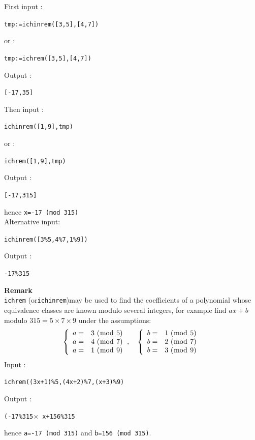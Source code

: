 \documentclass[a4paper,11pt]{book}
\begin{document}
First input :
\begin{center}{\tt tmp:=ichinrem([3,5],[4,7])}\end{center}
or :
\begin{center}{\tt tmp:=ichrem([3,5],[4,7])}\end{center}
Output :
\begin{center}{\tt [-17,35] }\end{center}
Then input :
\begin{center}{\tt ichinrem([1,9],tmp)}\end{center}
or :
\begin{center}{\tt ichrem([1,9],tmp)}\end{center}
Output :
\begin{center}{\tt [-17,315] }\end{center}
hence {\tt x=-17 (mod 315)}\\
Alternative input:\\
\begin{center}{\tt ichinrem([3\%5,4\%7,1\%9])}\end{center}
Output :
\begin{center}{\tt -17\%315 }\end{center}

{\bf Remark}\\
{\tt ichrem} (or{\tt ichinrem})may be used to find the coefficients of a polynomial 
whose equivalence classes are known modulo several integers, for example find
$ax+b$ modulo $315=5 \times 7 \times 9$ under the assumptions:
$${\tt \left \{ \begin{array}{rl} a=&3\ (\bmod\ 5)\\ 
a=&4\ (\bmod\ 7) \\ 
a=&1\ (\bmod\ 9) \end{array}\right.},
\quad 
{\tt \left \{ \begin{array}{rl} b=&1\ (\bmod\ 5)\\ 
b=&2\ (\bmod\ 7) \\ 
b=&3\ (\bmod\ 9) \end{array}\right.}$$
Input :
\begin{center}{\tt ichrem((3x+1)\%5,(4x+2)\%7,(x+3)\%9)}\end{center}
Output :
\begin{center}{\tt (-17\%315$\times$ x+156\%315 }\end{center}
hence {\tt a=-17 (mod 315)} and  {\tt b=156 (mod 315)}.
\end{document}
